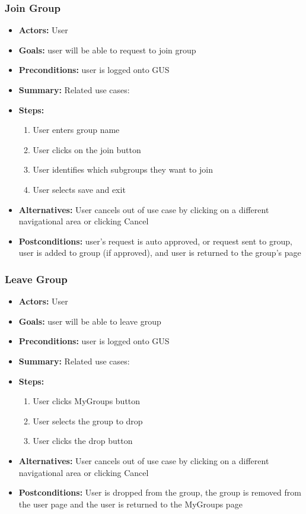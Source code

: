 \documentclass[12pt, oneside, letterpaper]{report}
\begin{document}
         \subsubsection{Join Group}
			\begin{itemize}
				\item{\textbf{Actors:} User}
				\item{\textbf{Goals:} user will be able to request to join group}
				\item{\textbf{Preconditions:} user is logged onto GUS}
				\item{\textbf{Summary:} Related use cases: }
				\item{\textbf{Steps:}
				\begin{enumerate}
					\item{User enters group name}
					\item{User clicks on the join button}
					\item{User identifies which subgroups they want to join}
					\item{User selects save and exit}
				\end{enumerate}
				}
				\item{\textbf{Alternatives:} User cancels out of use case by clicking on a different navigational area or clicking Cancel}
				\item{\textbf{Postconditions:} user's request is auto approved, or request sent to group, user is added to group (if approved), and user is returned to the group's page}
			\end{itemize}
         \subsubsection{Leave Group}
			\begin{itemize}
				\item{\textbf{Actors:} User}
				\item{\textbf{Goals:} user will be able to leave group}
				\item{\textbf{Preconditions:} user is logged onto GUS}
				\item{\textbf{Summary:} Related use cases: }
				\item{\textbf{Steps:}
				\begin{enumerate}
					\item{User clicks MyGroups button}
					\item{User selects the group to drop}
					\item{User clicks the drop button}
				\end{enumerate}
				}
				\item{\textbf{Alternatives:} User cancels out of use case by clicking on a different navigational area or clicking Cancel}
				\item{\textbf{Postconditions:} User is dropped from the group, the group is removed from the user page and the user is returned to the MyGroups page}
			\end{itemize}
\end{document}
